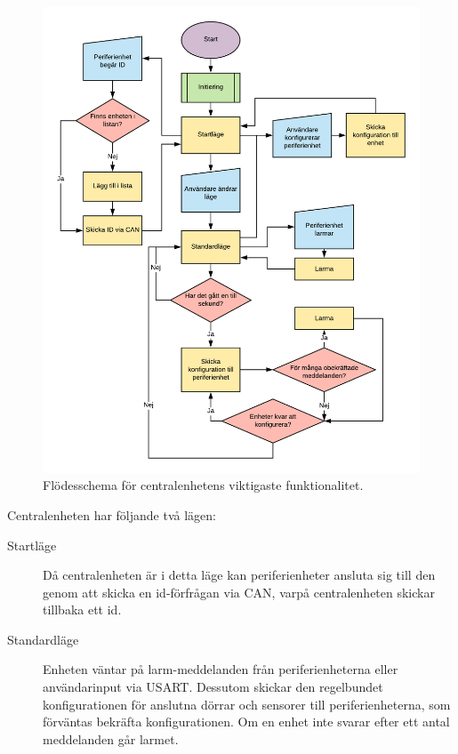 \documentclass{article}
\begin{document}
\begin{figure}[H]
    \centering
    \includegraphics[scale=0.3]{figurer/Centralenhet.png}
    \caption{Flödesschema för centralenhetens viktigaste funktionalitet.}
    \label{fig:centralflöde}
\end{figure}

Centralenheten har följande två lägen:

\begin{description}
    \item[Startläge] Då centralenheten är i detta läge kan periferienheter ansluta sig till den genom att skicka en id-förfrågan via CAN, varpå centralenheten skickar tillbaka ett id.

    
    \item[Standardläge] Enheten väntar på larm-meddelanden från periferienheterna eller användarinput via USART. Dessutom skickar den regelbundet konfigurationen för anslutna dörrar och sensorer till periferienheterna, som förväntas bekräfta konfigurationen.
    Om en enhet inte svarar efter ett antal meddelanden går larmet.
\end{description}
\end{document}
